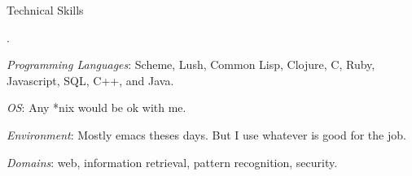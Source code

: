 \begin{rubric}{Technical Skills}{

  .

  
  \entry* \emph{Programming Languages}: Scheme, Lush, Common Lisp,
  Clojure, C, Ruby, Javascript, SQL, C++, and Java.
  
  \entry* \emph{OS}: Any *nix would be ok with me.

  \entry* \emph{Environment}: Mostly emacs theses days. But I use
  whatever is good for the job.

  \entry* \emph{Domains}: web, information retrieval, pattern
  recognition, security.
  
}\end{rubric}
